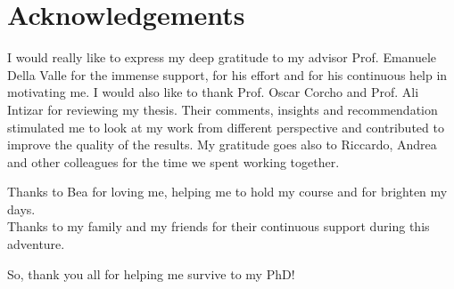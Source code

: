 \section*{Acknowledgements}

I would really like to express my deep gratitude to my advisor Prof. Emanuele Della Valle for the immense support, for his effort and for his continuous help in motivating me.
I would also like to thank Prof. Oscar Corcho and Prof. Ali Intizar for reviewing my thesis. Their comments, insights and recommendation stimulated me to look at my work from different perspective and contributed to improve the quality of the results.
My gratitude goes also to Riccardo, Andrea and other colleagues for the time we spent working together.

Thanks to Bea for loving me, helping me to hold my course and for brighten my days.\\
Thanks to my family and my friends for their continuous support during this adventure.

So, thank you all for helping me survive to my PhD!